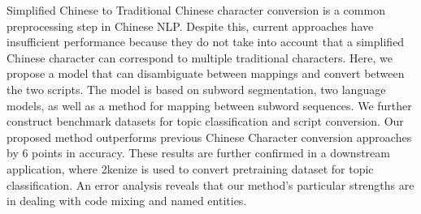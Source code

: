 Simplified Chinese to Traditional Chinese character conversion is a common preprocessing step in Chinese NLP. Despite this, current approaches have insufficient performance because they do not take into account that a simplified Chinese character can correspond to multiple traditional characters. Here, we propose a model that can disambiguate between mappings and convert between the two scripts. The model is based on subword segmentation, two language models, as well as a method for mapping between subword sequences. We further construct benchmark datasets for topic classification and script conversion. Our proposed method outperforms previous Chinese Character conversion approaches by 6 points in accuracy. These results are further confirmed in a downstream application, where 2kenize is used to convert pretraining dataset for topic classification. An error analysis reveals that our method's particular strengths are in dealing with code mixing and named entities.
